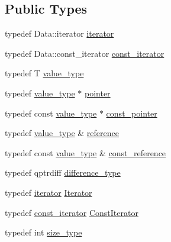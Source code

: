 \subsection*{Public Types}
\begin{DoxyCompactItemize}
\item 
typedef Data\+::iterator \hyperlink{class_q_vector_af6ac26e0dfede6e3045be0c947201267}{iterator}
\item 
typedef Data\+::const\+\_\+iterator \hyperlink{class_q_vector_a01e19bfad7fefd3e97ef197f4ed2cceb}{const\+\_\+iterator}
\item 
typedef T \hyperlink{class_q_vector_afb003dbc70603eacc89c0c7ea495dd3d}{value\+\_\+type}
\item 
typedef \hyperlink{class_q_vector_afb003dbc70603eacc89c0c7ea495dd3d}{value\+\_\+type} $\ast$ \hyperlink{class_q_vector_ae3fa870723fe1109c22b1091d54075fa}{pointer}
\item 
typedef const \hyperlink{class_q_vector_afb003dbc70603eacc89c0c7ea495dd3d}{value\+\_\+type} $\ast$ \hyperlink{class_q_vector_aa5e3dc32b0a887d59bf5c5c30c95eb85}{const\+\_\+pointer}
\item 
typedef \hyperlink{class_q_vector_afb003dbc70603eacc89c0c7ea495dd3d}{value\+\_\+type} \& \hyperlink{class_q_vector_a86d1c26fb98028474e556d2e25b60633}{reference}
\item 
typedef const \hyperlink{class_q_vector_afb003dbc70603eacc89c0c7ea495dd3d}{value\+\_\+type} \& \hyperlink{class_q_vector_a4054473292677d3bc7d901db7b3b3f20}{const\+\_\+reference}
\item 
typedef qptrdiff \hyperlink{class_q_vector_aaccc790d3ba04fc52580cdfc9d9290fa}{difference\+\_\+type}
\item 
typedef \hyperlink{class_q_vector_af6ac26e0dfede6e3045be0c947201267}{iterator} \hyperlink{class_q_vector_a22a5801860ee27fedc7dca5062355089}{Iterator}
\item 
typedef \hyperlink{class_q_vector_a01e19bfad7fefd3e97ef197f4ed2cceb}{const\+\_\+iterator} \hyperlink{class_q_vector_a480cfc218d799ecba92075c848e605c6}{Const\+Iterator}
\item 
typedef int \hyperlink{class_q_vector_afd8d3d4bf5a63a0c92128507dee59282}{size\+\_\+type}
\end{DoxyCompactItemize}
